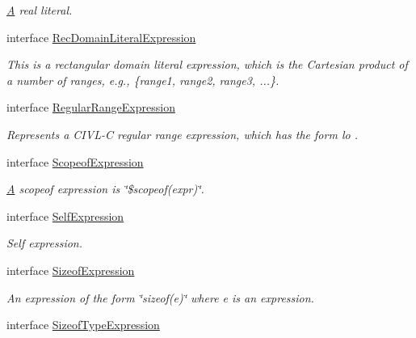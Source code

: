 \begin{DoxyCompactItemize}
\begin{DoxyCompactList}\small\item\em \hyperlink{structA}{A} real literal. \end{DoxyCompactList}\item 
interface \hyperlink{interfaceedu_1_1udel_1_1cis_1_1vsl_1_1civl_1_1model_1_1IF_1_1expression_1_1RecDomainLiteralExpression}{Rec\+Domain\+Literal\+Expression}
\begin{DoxyCompactList}\small\item\em This is a rectangular domain literal expression, which is the Cartesian product of a number of ranges, e.\+g., {\ttfamily \{range1, range2, range3, ...\}}. \end{DoxyCompactList}\item 
interface \hyperlink{interfaceedu_1_1udel_1_1cis_1_1vsl_1_1civl_1_1model_1_1IF_1_1expression_1_1RegularRangeExpression}{Regular\+Range\+Expression}
\begin{DoxyCompactList}\small\item\em Represents a C\+I\+V\+L-\/\+C regular range expression, which has the form {\ttfamily lo . }\end{DoxyCompactList}\item 
interface \hyperlink{interfaceedu_1_1udel_1_1cis_1_1vsl_1_1civl_1_1model_1_1IF_1_1expression_1_1ScopeofExpression}{Scopeof\+Expression}
\begin{DoxyCompactList}\small\item\em \hyperlink{structA}{A} scopeof expression is \char`\"{}\$scopeof(expr)\char`\"{}. \end{DoxyCompactList}\item 
interface \hyperlink{interfaceedu_1_1udel_1_1cis_1_1vsl_1_1civl_1_1model_1_1IF_1_1expression_1_1SelfExpression}{Self\+Expression}
\begin{DoxyCompactList}\small\item\em Self expression. \end{DoxyCompactList}\item 
interface \hyperlink{interfaceedu_1_1udel_1_1cis_1_1vsl_1_1civl_1_1model_1_1IF_1_1expression_1_1SizeofExpression}{Sizeof\+Expression}
\begin{DoxyCompactList}\small\item\em An expression of the form \char`\"{}sizeof(e)\char`\"{} where e is an expression. \end{DoxyCompactList}\item 
interface \hyperlink{interfaceedu_1_1udel_1_1cis_1_1vsl_1_1civl_1_1model_1_1IF_1_1expression_1_1SizeofTypeExpression}{Sizeof\+Type\+Expression}

\end{DoxyCompactItemize}
